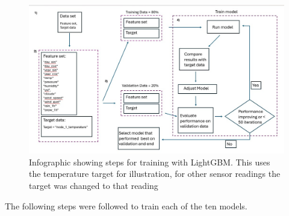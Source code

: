 \begin{figure}[H]
    \centering
    \includegraphics[width=1\textwidth]{contents/part-3/fig3/machine-learning-diagram2.jpg}
    \caption{Infographic showing steps for training with LightGBM. This uses the temperature target for illustration, for other sensor readings the target was changed to that reading}
    \label{fig:machine_diagram}
\end{figure}

The following steps were followed to train each of the ten models.

